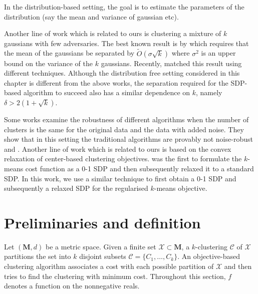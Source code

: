 \documentclass[12pt]{article}
\newcommand{\mc}{\mathcal}
\newcommand{\mb}{\mathbf}
\begin{document}
In the distribution-based setting, the goal is to estimate the parameters of the distribution (say the mean and variance of gaussian etc). 



  

Another line of work which is related to ours is clustering a mixture of $k$ gaussians with few adversaries. The best known result is by \cite{awasthi2012improved} which requires that the mean of the gaussians be separated by $\tilde O(\sigma \sqrt{k})$ where $\sigma^2$ is an upper bound on the variance of the $k$ gaussians. Recently, \cite{charikar2017learning} matched this result using different techniques. Although the distribution free setting considered in this chapter is different from the above works, the separation required for the SDP-based algorithm to succeed also has a similar dependence on $k$, namely $\delta > 2(1 + \sqrt{k})$. 


Some works examine the robustness of different algorithms when the number of clusters is the same for the original data and the data with added noise. They show that in this setting the traditional algorithms are provably not noise-robust \cite{hennig2008dissolution} and \cite{ackerman2013clustering}. Another line of work which is related to ours is based on the convex relaxation of center-based clustering objectives. \cite{peng2007approximating} was the first to formulate the $k$-means cost function as a 0-1 SDP and then subsequently relaxed it to a standard SDP. In this work, we use a similar technique to first obtain a 0-1 SDP and subsequently a relaxed SDP for the regularised $k$-means objective. 

\section{Preliminaries and definition}
\label{sec:pre}

Let $(\mb M, d)$ be a metric space. Given a finite set $\mc X \subset \mb M$, a $k$-clustering $\mc C$ of $\mc X$ partitions the set into $k$ disjoint subsets $\mc C = \{C_1, \ldots, C_k\}$. An objective-based clustering algorithm associates a cost with each possible partition of $\mc X$ and then tries to find the clustering with minimum cost. Throughout this section, $f$ denotes a function on the nonnegative reals.
\end{document}
